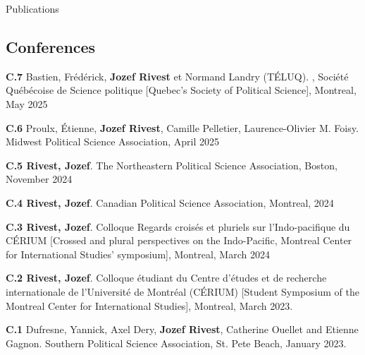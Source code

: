 \documentclass{resume} %
\begin{document}
\begin{rSection}{Publications}
\subsection*{Conferences}

{\textbf{C.7} Bastien, Frédérick, \textbf{Jozef Rivest} et Normand Landry (TÉLUQ). , Société Québécoise de Science politique [Quebec's Society of Political Science], Montreal, May 2025}

{\textbf{C.6} Proulx, Étienne, \textbf{Jozef Rivest}, Camille Pelletier, Laurence-Olivier M. Foisy.  Midwest Political Science Association, {April 2025}}

{\textbf{C.5 Rivest, Jozef}.  The Northeastern Political Science Association, Boston, November 2024}

{\textbf{C.4 Rivest, Jozef}.  Canadian Political Science Association, Montreal, 2024} \par

{\textbf{C.3 Rivest, Jozef}.  Colloque Regards croisés et pluriels sur l'Indo-pacifique du CÉRIUM [Crossed and plural perspectives on the Indo-Pacific, Montreal Center for International Studies' symposium], Montreal, March 2024} \par

{\textbf{C.2 Rivest, Jozef}.  Colloque étudiant du Centre d’études et de recherche internationale de l’Université de Montréal (CÉRIUM) [Student Symposium of the Montreal Center for International Studies], Montreal, March 2023.} \par

{\textbf{C.1} Dufresne, Yannick, Axel Dery, \textbf{Jozef Rivest}, Catherine Ouellet and Etienne Gagnon.  Southern Political Science Association, St. Pete Beach, January 2023.}


\end{rSection}
\end{document}
